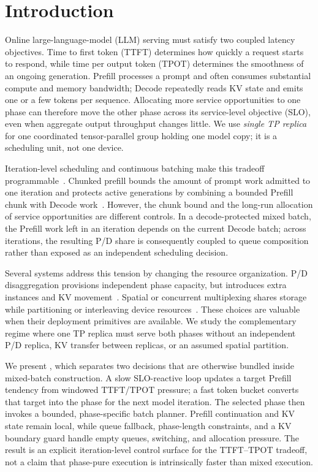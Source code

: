 \section{Introduction}
\label{sec:introduction}

Online large-language-model (LLM) serving must satisfy two coupled latency
objectives. Time to first token (TTFT) determines how quickly a request starts
to respond, while time per output token (TPOT) determines the smoothness of an
ongoing generation. Prefill processes a prompt and often consumes substantial
compute and memory bandwidth; Decode repeatedly reads KV state and emits one
or a few tokens per sequence. Allocating more service opportunities to one
phase can therefore move the other phase across its service-level objective
(SLO), even when aggregate output throughput changes little. We use
\emph{single TP replica} for one coordinated tensor-parallel group holding
one model copy; it is a scheduling unit, not one device.

Iteration-level scheduling and continuous batching make this tradeoff
programmable~\cite{yu2022orca,kwon2023vllm}. Chunked prefill bounds the amount
of prompt work admitted to one iteration and protects active generations by
combining a bounded Prefill chunk with Decode work~\cite{agrawal2024sarathi,
holmes2024fastgen}. However, the chunk bound and the long-run allocation of
service opportunities are different controls. In a decode-protected mixed
batch, the Prefill work left in an iteration depends on the current Decode
batch; across iterations, the resulting P/D share is consequently coupled to
queue composition rather than exposed as an independent scheduling decision.

Several systems address this tension by changing the resource organization.
P/D disaggregation provisions independent phase capacity, but introduces extra
instances and KV movement~\cite{patel2024splitwise,zhong2024distserve,
hu2024tetrinfer,jin2024pdserve,strati2024dejavu,qin2025mooncake}. Spatial or
concurrent multiplexing shares storage while partitioning or interleaving
device resources~\cite{duan2024muxserve,chen2026muxwise,hong2025semipd,
shi2025nexus,lin2026bullet,gao2026duetserve}. These choices are valuable when
their deployment primitives are available. We study the complementary regime
where one TP replica must serve both phases without an independent P/D replica,
KV transfer between replicas, or an assumed spatial partition.

We present \system{}, which separates two decisions that are otherwise bundled
inside mixed-batch construction. A slow SLO-reactive loop updates a target
Prefill tendency from windowed TTFT/TPOT pressure; a fast token bucket converts
that target into the phase for the next model iteration. The selected phase
then invokes a bounded, phase-specific batch planner. Prefill continuation and
KV state remain local, while queue fallback, phase-length constraints, and a KV
boundary guard handle empty queues, switching, and allocation pressure. The
result is an explicit iteration-level control surface for the TTFT--TPOT
tradeoff, not a claim that phase-pure execution is intrinsically faster than
mixed execution.

